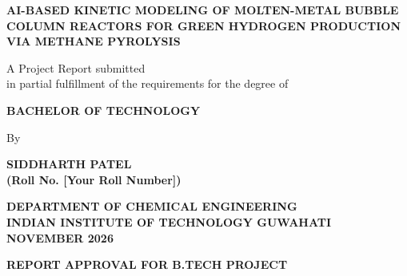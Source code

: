\documentclass[12pt,a4paper,oneside]{report}
\begin{document}
\begin{titlepage}
\begin{center}
\vspace*{10mm}
{\fontsize{22}{26}\selectfont \textbf{AI-BASED KINETIC MODELING OF MOLTEN-METAL BUBBLE COLUMN REACTORS FOR GREEN HYDROGEN PRODUCTION VIA METHANE PYROLYSIS}\par}

\vspace{25mm}
{\fontsize{14}{18}\selectfont A Project Report submitted\\
in partial fulfillment of the requirements for the degree of\par}

\vspace{10mm}
{\fontsize{16}{20}\selectfont \textbf{BACHELOR OF TECHNOLOGY}\par}

\vspace{25mm}
{\fontsize{14}{18}\selectfont By\par}
\vspace{5mm}
{\fontsize{16}{20}\selectfont \textbf{SIDDHARTH PATEL}\\
\textbf{(Roll No. [Your Roll Number])}\par}

\vfill
{\fontsize{14}{18}\selectfont
\textbf{DEPARTMENT OF CHEMICAL ENGINEERING}\\
\textbf{INDIAN INSTITUTE OF TECHNOLOGY GUWAHATI}\\
\textbf{NOVEMBER 2026}\par}
\vspace*{10mm}
\end{center}
\end{titlepage}

\setcounter{page}{2}

\begin{center}
{\fontsize{16}{20}\selectfont \textbf{REPORT APPROVAL FOR B.TECH PROJECT}\par}
\end{center}
\vspace{15mm}
\end{document}
